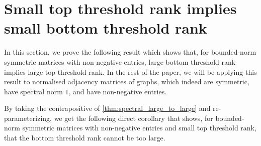 \chapter{Small top threshold rank implies small bottom threshold rank}

In this section, we prove the following result which shows that, for bounded-norm symmetric matrices with non-negative entries, large bottom threshold rank implies large top threshold rank.
In the rest of the paper, we will be applying this result to normalised adjacency matrices of graphs, which indeed are symmetric, have spectral norm $1$, and have non-negative entries.


By taking the contrapositive of \cref{thm:spectral_large_to_large} and re-parameterizing, we get the following direct corollary that shows, for bounded-norm symmetric matrices with non-negative entries and small top threshold rank, that the bottom threshold rank cannot be too large.


